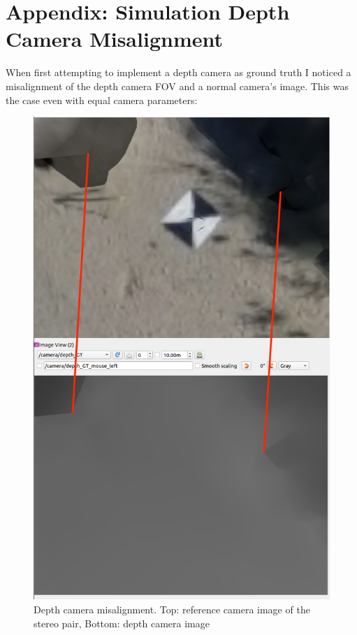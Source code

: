 \chapter{Appendix: Simulation Depth Camera Misalignment}\label{sec:appendix:gz_depth_camera}

When first attempting to implement a depth camera as ground truth I noticed a misalignment of the depth camera FOV and a normal camera's image. This was the case even with equal camera parameters:


\begin{figure}[ht]
    \centering
    \includegraphics[scale=0.4]{images/appendix/GT_error/Screenshot from 2023-11-09 14-48-24.png}
    \caption{Depth camera misalignment. Top: reference camera image of the stereo pair, Bottom: depth camera image}
    \label{fig:GT_error_sim}
\end{figure}


